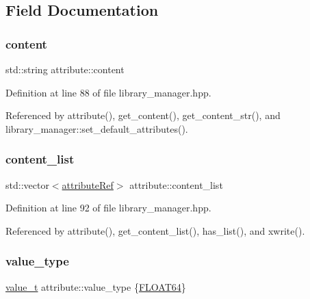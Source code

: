 \subsection{Field Documentation}
\mbox{\label{structattribute_a45604f9a4f97f3177fac396cf9a25a21}} 
\subsubsection{\texorpdfstring{content}{content}}
{\footnotesize\ttfamily std\+::string attribute\+::content\hspace{0.3cm}{\ttfamily [private]}}



Definition at line 88 of file library\+\_\+manager.\+hpp.



Referenced by attribute(), get\+\_\+content(), get\+\_\+content\+\_\+str(), and library\+\_\+manager\+::set\+\_\+default\+\_\+attributes().

\mbox{\label{structattribute_afa8bf3742e4a53fb2dbb76e1153ed15c}} 
\subsubsection{\texorpdfstring{content\+\_\+list}{content\_list}}
{\footnotesize\ttfamily std\+::vector$<$\hyperlink{library__manager_8hpp_a46399d2eacc03fb10f84fb33987ab8e3}{attribute\+Ref}$>$ attribute\+::content\+\_\+list\hspace{0.3cm}{\ttfamily [private]}}



Definition at line 92 of file library\+\_\+manager.\+hpp.



Referenced by attribute(), get\+\_\+content\+\_\+list(), has\+\_\+list(), and xwrite().

\mbox{\label{structattribute_a214bbc386224ecfa7ad117b742d07546}} 
\subsubsection{\texorpdfstring{value\+\_\+type}{value\_type}}
{\footnotesize\ttfamily \hyperlink{structattribute_a96d7b81ba16957b777d234cf215f004d}{value\+\_\+t} attribute\+::value\+\_\+type \{\hyperlink{structattribute_a96d7b81ba16957b777d234cf215f004dadcd22770c2c0f0c58b30667ed8d81d73}{F\+L\+O\+A\+T64}\}\hspace{0.3cm}{\ttfamily [private]}}



